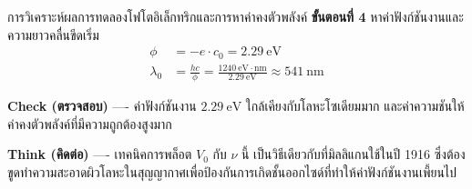 \begin{psctbox}{การวิเคราะห์ผลการทดลองโฟโตอิเล็กทริกและการหาค่าคงตัวพลังค์}
\textbf{ขั้นตอนที่ 4} หาค่าฟังก์ชันงานและความยาวคลื่นขีดเริ่ม
\begin{align*}
\phi &= -e \cdot c_0 = 2.29~\text{eV} \\
\lambda_0 &= \frac{hc}{\phi} = \frac{1240~\text{eV}\cdot\text{nm}}{2.29~\text{eV}} \approx 541~\text{nm}
\end{align*}

\textbf{Check (ตรวจสอบ)} ---- ค่าฟังก์ชันงาน $2.29~\text{eV}$ ใกล้เคียงกับโลหะโซเดียมมาก และค่าความชันให้ค่าคงตัวพลังค์ที่มีความถูกต้องสูงมาก

\textbf{Think (คิดต่อ)} ---- เทคนิคการพล็อต $V_0$ กับ $\nu$ นี้ เป็นวิธีเดียวกับที่มิลลิแกนใช้ในปี 1916 ซึ่งต้องขูดทำความสะอาดผิวโลหะในสุญญากาศเพื่อป้องกันการเกิดชั้นออกไซด์ที่ทำให้ค่าฟังก์ชันงานเพี้ยนไป
\end{psctbox}

